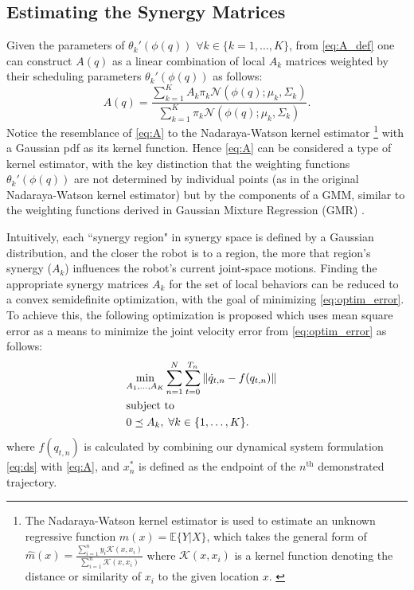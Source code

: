 \documentclass[letterpaper, 10 pt, conference,fleqn]{ieeeconf}
\begin{document}
\subsection{Estimating the Synergy Matrices}
Given the parameters of $\theta_k'(\phi(q))$ $\forall k \in \{k=1,\dots,K\}$, from \eqref{eq:A_def} one can construct $A(q)$ as a linear combination of local $A_k$ matrices weighted by their scheduling parameters $\theta_k'(\phi(q))$ as follows: 
\begin{equation}
\label{eq:A}
A(q) = \frac{\sum_{k=1}^K A_k \pi_k\mathcal{N}(\phi(q); \mu_k, \Sigma_k)}{\sum_{k=1}^K \pi_k\mathcal{N} (\phi(q); \mu_k, \Sigma_k)}.
\end{equation} 
Notice the resemblance of \eqref{eq:A} to the Nadaraya-Watson kernel estimator \cite{nadaraya1964regress,watson1964regress}\footnote{The Nadaraya-Watson kernel estimator is used to estimate an unknown regressive function $m(x) = \mathbb{E}\{Y|X\}$, which takes the general form of $\widehat{m}(x) = \frac{\sum_{i=1}^n y_i \mathcal{K}(x,x_i)}{\sum_{i=1}^n \mathcal{K}(x,x_i)}$ where $\mathcal{K}(x,x_i)$ is a kernel function denoting the distance or similarity of $x_i$ to the given location $x$. \cite{nadaraya1964regress,watson1964regress}} with a Gaussian pdf as its kernel function. Hence \eqref{eq:A} can be considered a type of kernel estimator, with the key distinction that the weighting functions $\theta_k'(\phi(q))$ are not determined by individual points (as in the original Nadaraya-Watson kernel estimator) but by the components of a GMM, similar to the weighting functions derived in Gaussian Mixture Regression (GMR) \cite{sung2004gmr}. 

Intuitively, each ``synergy region" in synergy space is defined by a Gaussian distribution, and the closer the robot is to a region, the more that region's synergy ($A_k$) influences the robot's current joint-space motions. Finding the appropriate synergy matrices $A_k$ for the set of local behaviors can be reduced to a convex semidefinite optimization, with the goal of minimizing \eqref{eq:optim_error}. To achieve this, the following optimization is proposed which uses mean square error as a means to minimize the joint velocity error from \eqref{eq:optim_error} as follows:
\begin{equation}
\vspace{-10pt}
\begin{aligned}
&\underset{A_1, \dots, A_K}{\text{min}} 
\sum_{n=1}^N\sum_{t=0}^{T_n} \left \| \dot{q}_{t,n} - f(q_{t,n}) \right \| \\
& \text{subject to}&\\
&  0 \preceq A_k, \; \forall k \in \{1, \dots, K\}. &
\end{aligned}
\label{eq:opt}
\end{equation}
where $f(q_{t,n})$ is calculated by combining our dynamical system formulation \eqref{eq:ds} with \eqref{eq:A}, and $x^*_{n}$ is defined as the endpoint of the $ n^{\text{th}} $ demonstrated trajectory.
\end{document}
